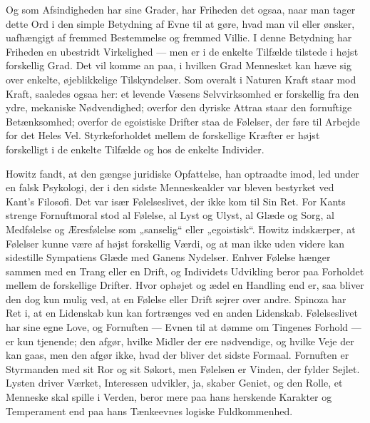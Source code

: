 \documentclass[12pt,a4paper,openany]{book}
\newcommand{\opage}[1]{\marginnote{\footnotesize\textit{[#1]}}}
\begin{document}
Og som Afsindigheden har sine Grader, har Friheden det ogsaa, naar man tager
dette Ord i den simple Betydning af Evne til at gøre, hvad man vil eller
ønsker, uafhængigt af fremmed Bestemmelse og fremmed Villie. I denne Betydning
har Friheden en ubestridt Virkelighed --- men er i de enkelte Tilfælde tilstede
i højst forskellig Grad. Det vil komme an paa, i hvilken Grad Mennesket kan
hæve sig over enkelte, øjeblikkelige Tilskyndelser. Som overalt i Naturen Kraft
staar mod Kraft, saaledes ogsaa her: et levende Væsens Selvvirksomhed er
forskellig fra den ydre, mekaniske Nødvendighed; overfor den dyriske Attraa
staar den fornuftige Betænksomhed; overfor de egoistiske Drifter staa de
Følelser, der føre til Arbejde for det Heles Vel. Styrkeforholdet mellem
\setcounter{footnote}{0}%
\opage{84}de forskellige Kræfter er højst forskelligt i de enkelte Tilfælde og
hos de enkelte Individer.

Howitz fandt, at den gængse juridiske Opfattelse, han optraadte imod, led under
en falsk Psykologi, der i den sidste Menneskealder var bleven bestyrket ved
Kant's Filosofi. Det var især Følelseslivet, der ikke kom til Sin Ret. For
Kants strenge Fornuftmoral stod al Følelse, al Lyst og Ulyst, al Glæde og Sorg,
al Medfølelse og Æresfølelse som „sanselig“ eller „egoistisk“. Howitz
indskærper, at Følelser kunne være af højst forskellig Værdi, og at man ikke
uden videre kan sidestille Sympatiens Glæde med Ganens Nydelser. Enhver Følelse
hænger sammen med en Trang eller en Drift, og Individets Udvikling beror paa
Forholdet mellem de forskellige Drifter. Hvor ophøjet og ædel en Handling end
er, saa bliver den dog kun mulig ved, at en Følelse eller Drift sejrer over
andre. Spinoza har Ret i, at en Lidenskab kun kan fortrænges ved en anden
Lidenskab. Følelseslivet har sine egne Love, og Fornuften --- Evnen til at
dømme om Tingenes Forhold --- er kun tjenende; den afgør, hvilke Midler der ere
nødvendige, og hvilke Veje der kan gaas, men den afgør ikke, hvad der bliver
det sidste Formaal. Fornuften er Styrmanden med sit Ror og sit Søkort, men
Følelsen er Vinden, der fylder Sejlet. Lysten driver Værket, Interessen
udvikler, ja, skaber Geniet, og den Rolle, et Menneske skal spille i Verden,
beror mere paa hans herskende Karakter og Temperament end paa hans Tænkeevnes
logiske Fuldkommenhed.
\end{document}
